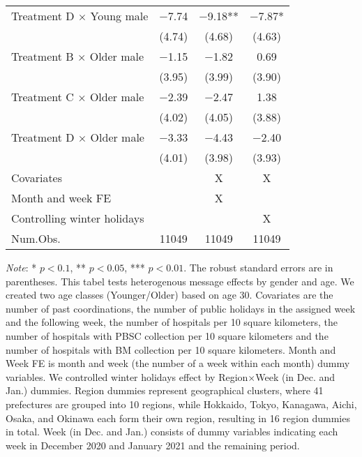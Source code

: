 \documentclass[12pt, a4paper]{article}
\begin{document}
\begin{table}[H]
\begin{threeparttable}
\begin{tabular}[t]{lccc}
Treatment D $\times$ Young male & \num{-7.74} & \num{-9.18}** & \num{-7.87}*\\
 & (\num{4.74}) & (\num{4.68}) & (\num{4.63})\\
Treatment B $\times$ Older male & \num{-1.15} & \num{-1.82} & \num{0.69}\\
 & (\num{3.95}) & (\num{3.99}) & (\num{3.90})\\
Treatment C $\times$ Older male & \num{-2.39} & \num{-2.47} & \num{1.38}\\
 & (\num{4.02}) & (\num{4.05}) & (\num{3.88})\\
Treatment D $\times$ Older male & \num{-3.33} & \num{-4.43} & \num{-2.40}\\
 & (\num{4.01}) & (\num{3.98}) & (\num{3.93})\\
\midrule
Covariates &  & X & X\\
Month and week FE &  & X & \\
Controlling winter holidays &  &  & X\\
Num.Obs. & \num{11049} & \num{11049} & \num{11049}\\
\bottomrule
\end{tabular}
\begin{tablenotes}
\item \emph{Note}: * $p < 0.1$, ** $p < 0.05$, *** $p < 0.01$. The robust standard errors are in parentheses. This tabel tests heterogenous message effects by gender and age. We created two age classes (Younger/Older) based on age 30. Covariates are the number of past coordinations, the number of public holidays in the assigned week and the following week, the number of hospitals per 10 square kilometers, the number of hospitals with PBSC collection per 10 square kilometers and the number of hospitals with BM collection per 10 square kilometers. Month and Week FE is month and week (the number of a week within each month) dummy variables. We controlled winter holidays effect by Region$\times$Week (in Dec. and Jan.) dummies. Region dummies represent geographical clusters, where 41 prefectures are grouped into 10 regions, while Hokkaido, Tokyo, Kanagawa, Aichi, Osaka, and Okinawa each form their own region, resulting in 16 region dummies in total. Week (in Dec. and Jan.) consists of dummy variables indicating each week in December 2020 and January 2021 and the remaining period.
\end{tablenotes}
\end{threeparttable}
\end{table}
\end{document}
